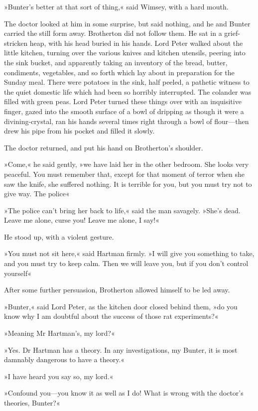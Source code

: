 »Bunter's better at that sort of thing,« said Wimsey, with a hard mouth.

The doctor looked at him in some surprise, but said nothing, and he and Bunter carried the still form away. Brotherton did not follow them. He sat in a grief-stricken heap, with his head buried in his hands. Lord Peter walked about the little kitchen, turning over the various knives and kitchen utensils, peering into the sink bucket, and apparently taking an inventory of the bread, butter, condiments, vegetables, and so forth which lay about in preparation for the Sunday meal. There were potatoes in the sink, half peeled, a pathetic witness to the quiet domestic life which had been so horribly interrupted. The colander was filled with green peas. Lord Peter turned these things over with an inquisitive finger, gazed into the smooth surface of a bowl of dripping as though it were a divining-crystal, ran his hands several times right through a bowl of flour—then drew his pipe from his pocket and filled it slowly.

The doctor returned, and put his hand on Brotherton's shoulder.

»Come,« he said gently, »we have laid her in the other bedroom. She looks very peaceful. You must remember that, except for that moment of terror when she saw the knife, she suffered nothing. It is terrible for you, but you must try not to give way. The police\longdash«

»The police can't bring her back to life,« said the man savagely. »She's dead. Leave me alone, curse you! Leave me alone, I say!«

He stood up, with a violent gesture.

»You must not sit here,« said Hartman firmly. »I will give you something to take, and you must try to keep calm. Then we will leave you, but if you don't control yourself\longdash«

After some further persuasion, Brotherton allowed himself to be led away.

»Bunter,« said Lord Peter, as the kitchen door closed behind them, »do you know why I am doubtful about the success of those rat experiments?«

»Meaning Mr Hartman's, my lord?«

»Yes. Dr Hartman has a theory. In any investigations, my Bunter, it is most damnably dangerous to have a theory.«

»I have heard you say so, my lord.«

»Confound you—you know it as well as I do! What is wrong with the doctor's theories, Bunter?«

